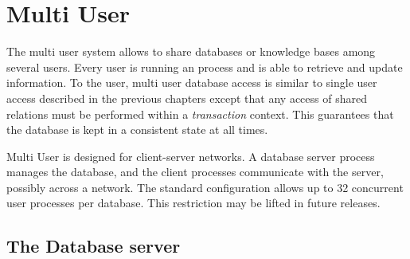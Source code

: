 %
% 
% 
% 
% 


\newpage

\chapter{Multi User \eclipse}
\label{multi}
The \eclipse multi user system allows to share databases or 
knowledge bases among several users. Every user is running an \eclipse
process and is able to retrieve and update information.
To the user, multi user database access is similar to single user 
access described in the previous chapters except that any
access of shared relations must be performed within a {\em transaction} context.
This guarantees that the database is kept in a consistent 
state at all times.

Multi User \eclipse is designed for client-server networks.
A database server process manages the database, and the \eclipse client
processes communicate with the server, possibly across a network.
The standard \eclipse configuration allows up to 32 concurrent user
processes per database.  This restriction may be lifted in future releases.

\section{The Database server}

